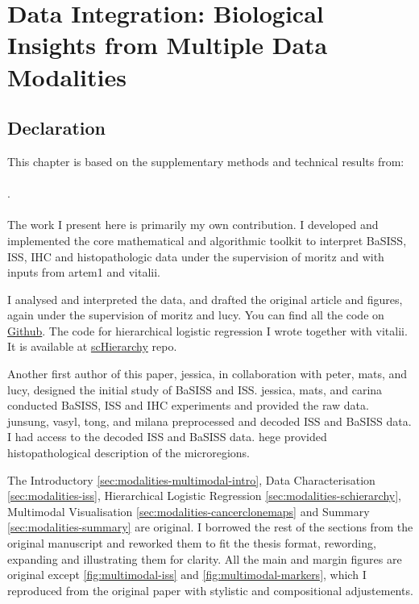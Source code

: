 \chapter{Data Integration: Biological Insights from  Multiple Data Modalities}
\label{sec:chapter-basiss-multimodal}

\section*{Declaration}

This chapter is based on the supplementary methods and technical results from:
\\~\\
 . 
\\~\\
The work I present here is primarily my own contribution. I developed and implemented the core mathematical and algorithmic toolkit to interpret \acs{BaSISS}, \acs{ISS}, \acs{IHC} and histopathologic data under the supervision of \ac{moritz} and with inputs from \ac{artem1} and \ac{vitalii}. 

I analysed and interpreted the data, and drafted the original article and figures, again under the supervision of \ac{moritz} and \ac{lucy}. You can find all the code on \href{https://github.com/gerstung-lab/BaSISS}{Github}. The code for hierarchical logistic regression I wrote together with \ac{vitalii}. It is available at \href{https://github.com/dissatisfaction-ai/scHierarchy}{scHierarchy} repo.

Another first author of this paper, \ac{jessica}, in collaboration with \ac{peter}, \ac{mats}, and \ac{lucy}, designed the initial study of \acs{BaSISS} and \acs{ISS}. \ac{jessica}, \ac{mats}, and \ac{carina} conducted \acs{BaSISS}, \acs{ISS} and \acs{IHC} experiments and provided the raw data. \ac{junsung}, \ac{vasyl}, \ac{tong}, and \ac{milana} preprocessed and decoded \acs{ISS} and \acs{BaSISS} data. I had access to the decoded \acs{ISS} and \acs{BaSISS} data. \ac{hege} provided histopathological description of the microregions.

The Introductory \cref{sec:modalities-multimodal-intro}, Data Characterisation \cref{sec:modalities-iss}, Hierarchical Logistic Regression \cref{sec:modalities-schierarchy}, Multimodal Visualisation \cref{sec:modalities-cancerclonemaps} and Summary \cref{sec:modalities-summary} are original. I borrowed the rest of the sections from the original manuscript and reworked them to fit the thesis format, rewording, expanding and illustrating them for clarity. All the main and margin figures are original except \cref{fig:multimodal-iss} and \cref{fig:multimodal-markers}, which I reproduced from the original paper with stylistic and compositional adjustements. 

